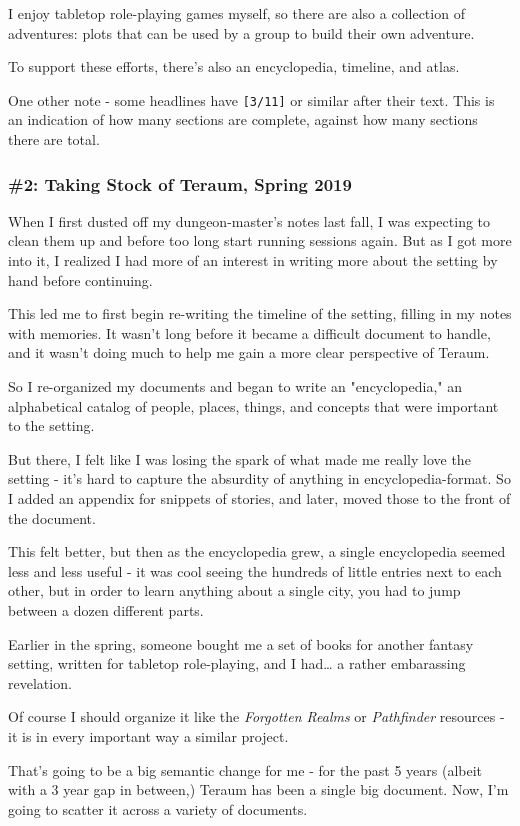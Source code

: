 \documentclass[11pt]{article}
\begin{document}
I enjoy tabletop role-playing games myself, so there are also a
collection of adventures: plots that can be used by a group to build
their own adventure.

To support these efforts, there's also an encyclopedia, timeline, and
atlas.

One other note - some headlines have \texttt{[3/11]} or similar after their
text. This is an indication of how many sections are complete, against
how many sections there are total.
\subsubsection*{\#2: Taking Stock of Teraum, Spring 2019}
\label{sec:org89d96fe}
When I first dusted off my dungeon-master's notes last fall, I was
expecting to clean them up and before too long start running sessions
again. But as I got more into it, I realized I had more of an interest
in writing more about the setting by hand before continuing.

This led me to first begin re-writing the timeline of the setting,
filling in my notes with memories. It wasn't long before it became a
difficult document to handle, and it wasn't doing much to help me gain
a more clear perspective of Teraum.

So I re-organized my documents and began to write an "encyclopedia,"
an alphabetical catalog of people, places, things, and concepts that
were important to the setting.

But there, I felt like I was losing the spark of what made me really
love the setting - it's hard to capture the absurdity of anything in
encyclopedia-format. So I added an appendix for snippets of stories,
and later, moved those to the front of the document.

This felt better, but then as the encyclopedia grew, a single
encyclopedia seemed less and less useful - it was cool seeing the
hundreds of little entries next to each other, but in order to learn
anything about a single city, you had to jump between a dozen
different parts.

Earlier in the spring, someone bought me a set of books for another
fantasy setting, written for tabletop role-playing, and I had\ldots{} a
rather embarassing revelation.

Of course I should organize it like the \emph{Forgotten Realms} or
\emph{Pathfinder} resources - it is in every important way a similar
project.

That's going to be a big semantic change for me - for the past 5 years
(albeit with a 3 year gap in between,) Teraum has been a single big
document. Now, I'm going to scatter it across a variety of documents.
\end{document}
